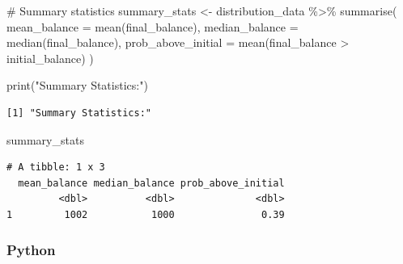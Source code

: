 \documentclass[
  letterpaper,
  DIV=11,
  numbers=noendperiod]{scrartcl}
\newenvironment{Shaded}{\begin{snugshade}}{\end{snugshade}}
\newcommand{\AttributeTok}[1]{\textcolor[rgb]{0.40,0.45,0.13}{#1}}
\newcommand{\CommentTok}[1]{\textcolor[rgb]{0.37,0.37,0.37}{#1}}
\newcommand{\FunctionTok}[1]{\textcolor[rgb]{0.28,0.35,0.67}{#1}}
\newcommand{\NormalTok}[1]{\textcolor[rgb]{0.00,0.23,0.31}{#1}}
\newcommand{\OtherTok}[1]{\textcolor[rgb]{0.00,0.23,0.31}{#1}}
\newcommand{\SpecialCharTok}[1]{\textcolor[rgb]{0.37,0.37,0.37}{#1}}
\newcommand{\StringTok}[1]{\textcolor[rgb]{0.13,0.47,0.30}{#1}}
\theoremstyle{definition}
\theoremstyle{remark}
\begin{document}
\begin{Shaded}
\begin{Highlighting}[]
\CommentTok{\# Summary statistics}
\NormalTok{summary\_stats }\OtherTok{\textless{}{-}}\NormalTok{ distribution\_data }\SpecialCharTok{\%\textgreater{}\%}
  \FunctionTok{summarise}\NormalTok{(}
    \AttributeTok{mean\_balance =} \FunctionTok{mean}\NormalTok{(final\_balance),}
    \AttributeTok{median\_balance =} \FunctionTok{median}\NormalTok{(final\_balance),}
    \AttributeTok{prob\_above\_initial =} \FunctionTok{mean}\NormalTok{(final\_balance }\SpecialCharTok{\textgreater{}}\NormalTok{ initial\_balance)}
\NormalTok{  )}

\FunctionTok{print}\NormalTok{(}\StringTok{"Summary Statistics:"}\NormalTok{)}
\end{Highlighting}
\end{Shaded}

\begin{verbatim}
[1] "Summary Statistics:"
\end{verbatim}

\begin{Shaded}
\begin{Highlighting}[]
\NormalTok{summary\_stats}
\end{Highlighting}
\end{Shaded}

\begin{verbatim}
# A tibble: 1 x 3
  mean_balance median_balance prob_above_initial
         <dbl>          <dbl>              <dbl>
1         1002           1000               0.39
\end{verbatim}

\subsubsection{Python}
\end{document}
